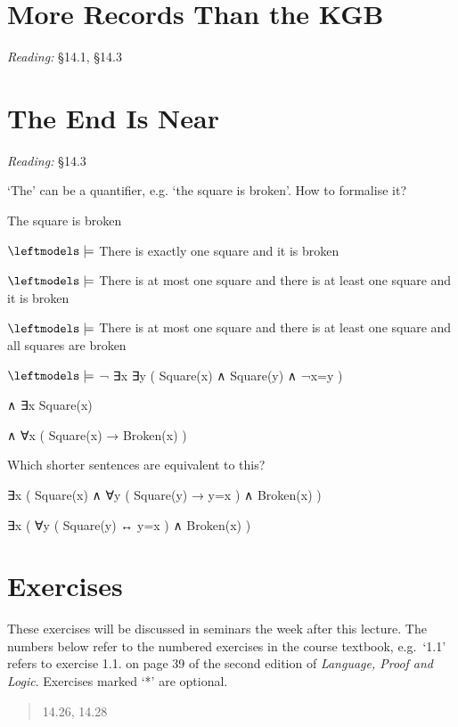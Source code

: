 \documentclass[12pt]{extarticle}
\begin{document}
\begin{multicols*}{3}
 
\section{More Records Than the KGB}
 
\emph{Reading:} §14.1, §14.3
 
 
 
\section{The End Is Near}
 
\emph{Reading:} §14.3
 
‘The’ can be a quantifier, e.g. ‘the square is broken’. How to formalise it?
 
The square is broken
 
$\leftmodels\models$ There is exactly one square and it is broken
 
$\leftmodels\models$ There is at most one square and there is at least one square and it is broken
 
$\leftmodels\models$ There is at most one square and there is at least one square and all squares are broken
 
$\leftmodels\models$ ¬ ∃x ∃y ( Square(x) ∧ Square(y) ∧ ¬x=y )
 
\hspace{5mm} ∧ ∃x Square(x)
 
\hspace{5mm} ∧ ∀x ( Square(x) → Broken(x) )
 
Which shorter sentences are equivalent to this?
 
∃x ( Square(x) ∧ ∀y ( Square(y) → y=x ) ∧ Broken(x) )
 
∃x ( ∀y ( Square(y) ↔ y=x ) ∧ Broken(x) )
 
\vfill
\begin{minipage}{\columnwidth}
\section{Exercises}
These exercises will be discussed in seminars the week after this lecture.
The numbers below refer to the numbered exercises in the course textbook, e.g.\ `1.1' refers to exercise 1.1. on page 39 of the second edition of \emph{Language, Proof and Logic}. Exercises marked `*' are optional.
 
\begin{quote}
14.26, 14.28
 
\end{quote}
\end{minipage}
 


\end{multicols*}
\end{document}
